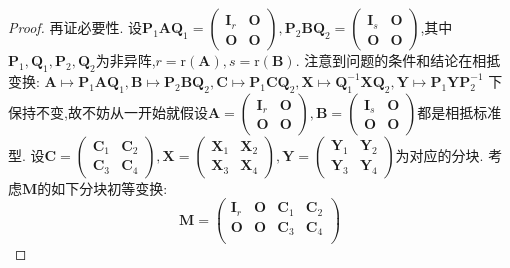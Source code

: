 \documentclass[../../main.tex]{subfiles}
\begin{document}
\begin{proof}
再证必要性. 设\(\boldsymbol{P}_1\boldsymbol{A}\boldsymbol{Q}_1=\begin{pmatrix}
\boldsymbol{I}_r&\boldsymbol{O}\\
\boldsymbol{O}&\boldsymbol{O}
\end{pmatrix},\boldsymbol{P}_2\boldsymbol{B}\boldsymbol{Q}_2=\begin{pmatrix}
\boldsymbol{I}_s&\boldsymbol{O}\\
\boldsymbol{O}&\boldsymbol{O}
\end{pmatrix}\),其中\(\boldsymbol{P}_1,\boldsymbol{Q}_1,\boldsymbol{P}_2,\boldsymbol{Q}_2\)为非异阵,\(r = \mathrm{r}(\boldsymbol{A}),s=\mathrm{r}(\boldsymbol{B})\). 注意到问题的条件和结论在相抵变换:
\(\boldsymbol{A}\mapsto\boldsymbol{P}_1\boldsymbol{A}\boldsymbol{Q}_1,\boldsymbol{B}\mapsto\boldsymbol{P}_2\boldsymbol{B}\boldsymbol{Q}_2,\boldsymbol{C}\mapsto\boldsymbol{P}_1\boldsymbol{C}\boldsymbol{Q}_2,\boldsymbol{X}\mapsto\boldsymbol{Q}_1^{-1}\boldsymbol{X}\boldsymbol{Q}_2,\boldsymbol{Y}\mapsto\boldsymbol{P}_1\boldsymbol{Y}\boldsymbol{P}_2^{-1}\)
下保持不变,故不妨从一开始就假设\(\boldsymbol{A}=\begin{pmatrix}
\boldsymbol{I}_r&\boldsymbol{O}\\
\boldsymbol{O}&\boldsymbol{O}
\end{pmatrix},\boldsymbol{B}=\begin{pmatrix}
\boldsymbol{I}_s&\boldsymbol{O}\\
\boldsymbol{O}&\boldsymbol{O}
\end{pmatrix}\)都是相抵标准型. 设\(\boldsymbol{C}=\begin{pmatrix}
\boldsymbol{C}_1&\boldsymbol{C}_2\\
\boldsymbol{C}_3&\boldsymbol{C}_4
\end{pmatrix},\boldsymbol{X}=\begin{pmatrix}
\boldsymbol{X}_1&\boldsymbol{X}_2\\
\boldsymbol{X}_3&\boldsymbol{X}_4
\end{pmatrix},\boldsymbol{Y}=\begin{pmatrix}
\boldsymbol{Y}_1&\boldsymbol{Y}_2\\
\boldsymbol{Y}_3&\boldsymbol{Y}_4
\end{pmatrix}\)为对应的分块. 考虑\(\boldsymbol{M}\)的如下分块初等变换:
\[
\boldsymbol{M}=\begin{pmatrix}
\boldsymbol{I}_r&\boldsymbol{O}&\boldsymbol{C}_1&\boldsymbol{C}_2\\
\boldsymbol{O}&\boldsymbol{O}&\boldsymbol{C}_3&\boldsymbol{C}_4\\

\end{pmatrix}\]
\end{proof}
\end{document}
